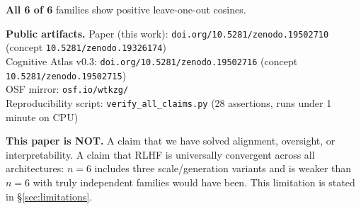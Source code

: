 \documentclass[11pt,letterpaper]{article}
\begin{document}
\begin{execbox}
\textbf{All 6 of 6} families show positive leave-one-out cosines.

\textbf{Public artifacts.}
\textbullet\; Paper (this work): \texttt{doi.org/10.5281/zenodo.19502710}
(concept \texttt{10.5281/zenodo.19326174})\\
\textbullet\; Cognitive Atlas v0.3: \texttt{doi.org/10.5281/zenodo.19502716}
(concept \texttt{10.5281/zenodo.19502715})\\
\textbullet\; OSF mirror: \texttt{osf.io/wtkzg/}\\
\textbullet\; Reproducibility script: \texttt{verify\_all\_claims.py}
(28 assertions, runs under 1 minute on CPU)

\textbf{This paper is NOT.}
\textbullet\; A claim that we have solved alignment, oversight, or
interpretability.
\textbullet\; A claim that RLHF is universally convergent across all
architectures: $n\!=\!6$ includes three scale/generation variants and is
weaker than $n\!=\!6$ with truly independent families would have been. This
limitation is stated in \S\ref{sec:limitations}.

\end{execbox}
\end{document}
